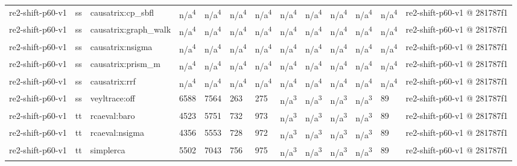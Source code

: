 \begin{table}[t]
\begin{tabular}{lllllllllllll}
re2-shift-p60-v1 & ss & causatrix:cp\_sbfl & n/a\textsuperscript{4} & n/a\textsuperscript{4} & n/a\textsuperscript{4} & n/a\textsuperscript{4} & n/a\textsuperscript{4} & n/a\textsuperscript{4} & n/a\textsuperscript{4} & n/a\textsuperscript{4} & n/a\textsuperscript{4} & re2-shift-p60-v1 @ 281787f1 \\
re2-shift-p60-v1 & ss & causatrix:graph\_walk & n/a\textsuperscript{4} & n/a\textsuperscript{4} & n/a\textsuperscript{4} & n/a\textsuperscript{4} & n/a\textsuperscript{4} & n/a\textsuperscript{4} & n/a\textsuperscript{4} & n/a\textsuperscript{4} & n/a\textsuperscript{4} & re2-shift-p60-v1 @ 281787f1 \\
re2-shift-p60-v1 & ss & causatrix:nsigma & n/a\textsuperscript{4} & n/a\textsuperscript{4} & n/a\textsuperscript{4} & n/a\textsuperscript{4} & n/a\textsuperscript{4} & n/a\textsuperscript{4} & n/a\textsuperscript{4} & n/a\textsuperscript{4} & n/a\textsuperscript{4} & re2-shift-p60-v1 @ 281787f1 \\
re2-shift-p60-v1 & ss & causatrix:prism\_m & n/a\textsuperscript{4} & n/a\textsuperscript{4} & n/a\textsuperscript{4} & n/a\textsuperscript{4} & n/a\textsuperscript{4} & n/a\textsuperscript{4} & n/a\textsuperscript{4} & n/a\textsuperscript{4} & n/a\textsuperscript{4} & re2-shift-p60-v1 @ 281787f1 \\
re2-shift-p60-v1 & ss & causatrix:rrf & n/a\textsuperscript{4} & n/a\textsuperscript{4} & n/a\textsuperscript{4} & n/a\textsuperscript{4} & n/a\textsuperscript{4} & n/a\textsuperscript{4} & n/a\textsuperscript{4} & n/a\textsuperscript{4} & n/a\textsuperscript{4} & re2-shift-p60-v1 @ 281787f1 \\
re2-shift-p60-v1 & ss & veyltrace:off & 6588 & 7564 & 263 & 275 & n/a\textsuperscript{3} & n/a\textsuperscript{3} & n/a\textsuperscript{3} & n/a\textsuperscript{3} & 89 & re2-shift-p60-v1 @ 281787f1 \\
re2-shift-p60-v1 & tt & rcaeval:baro & 4523 & 5751 & 732 & 973 & n/a\textsuperscript{3} & n/a\textsuperscript{3} & n/a\textsuperscript{3} & n/a\textsuperscript{3} & 89 & re2-shift-p60-v1 @ 281787f1 \\
re2-shift-p60-v1 & tt & rcaeval:nsigma & 4356 & 5553 & 728 & 972 & n/a\textsuperscript{3} & n/a\textsuperscript{3} & n/a\textsuperscript{3} & n/a\textsuperscript{3} & 89 & re2-shift-p60-v1 @ 281787f1 \\
re2-shift-p60-v1 & tt & simplerca & 5502 & 7043 & 756 & 975 & n/a\textsuperscript{3} & n/a\textsuperscript{3} & n/a\textsuperscript{3} & n/a\textsuperscript{3} & 89 & re2-shift-p60-v1 @ 281787f1 \\

\end{tabular}
\end{table}
